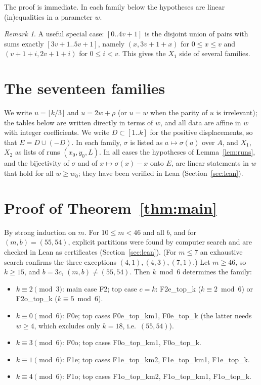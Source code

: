 \documentclass[11pt]{amsart}
\theoremstyle{definition}
\theoremstyle{remark}
\newtheorem{remark}[theorem]{Remark}
\newcommand{\fname}[1]{\textsf{#1}}
\newcommand{\Icc}[2]{[#1..#2]}
\begin{document}
The proof is immediate. In each family below the hypotheses are linear (in)equalities in a parameter $w$.

\begin{remark}
A useful special case: $\Icc{0}{4v+1}$ is the disjoint union of pairs with sums exactly $\Icc{3v+1}{5v+1}$, namely
$(x,3v+1+x)$ for $0\le x\le v$ and $(v+1+i,2v+1+i)$ for $0\le i<v$. This gives the $X_1$ side of several
families.
\end{remark}

\section{The seventeen families}\label{sec:families}

We write $u=\lfloor k/3\rfloor$ and $u=2w+\rho$ (or $u=w$ when the parity of $u$ is irrelevant); the tables
below are written directly in terms of $w$, and all data are affine in $w$ with integer coefficients. We write
$D\subset\Icc1k$ for the positive displacements, so that $E=D\cup(-D)$. In each family, $\sigma$ is listed as $a\mapsto\sigma(a)$ over $A$, and
$X_1$, $X_2$ as lists of runs $(x_0,y_0,L)$. In all cases the hypotheses of Lemma~\ref{lem:runs}, and the
bijectivity of $\sigma$ and of $x\mapsto\sigma(x)-x$ onto $E$, are linear statements in $w$ that hold for all
$w\ge w_0$; they have been verified in Lean (Section~\ref{sec:lean}).



\section{Proof of Theorem~\ref{thm:main}}\label{sec:proof}

By strong induction on $m$. For $10\le m<46$ and all $b$, and for $(m,b)=(55,54)$, explicit partitions were
found by computer search and are checked in Lean as certificates (Section~\ref{sec:lean}). (For $m\le 7$ an
exhaustive search confirms the three exceptions $(4,1),(4,3),(7,1)$.) Let $m\ge46$, so $k\ge15$, and $b=3c$, $(m,b)\ne(55,54)$. Then $k\bmod6$ determines the
family:

\begin{itemize}
\item $k\equiv2\pmod 3$: main case \fname{F2}; top case $c=k$: \fname{F2e\_top\_k} ($k\equiv2\bmod6$) or \fname{F2o\_top\_k} ($k\equiv5\bmod6$).
\item $k\equiv0\pmod6$: \fname{F0e}; top cases \fname{F0e\_top\_km1}, \fname{F0e\_top\_k} (the latter needs $w\ge4$, which excludes only $k=18$, i.e.\ $(55,54)$).
\item $k\equiv3\pmod6$: \fname{F0o}; top cases \fname{F0o\_top\_km1}, \fname{F0o\_top\_k}.
\item $k\equiv1\pmod6$: \fname{F1e}; top cases \fname{F1e\_top\_km2}, \fname{F1e\_top\_km1}, \fname{F1e\_top\_k}.
\item $k\equiv4\pmod6$: \fname{F1o}; top cases \fname{F1o\_top\_km2}, \fname{F1o\_top\_km1}, \fname{F1o\_top\_k}.
\end{itemize}
\end{document}
